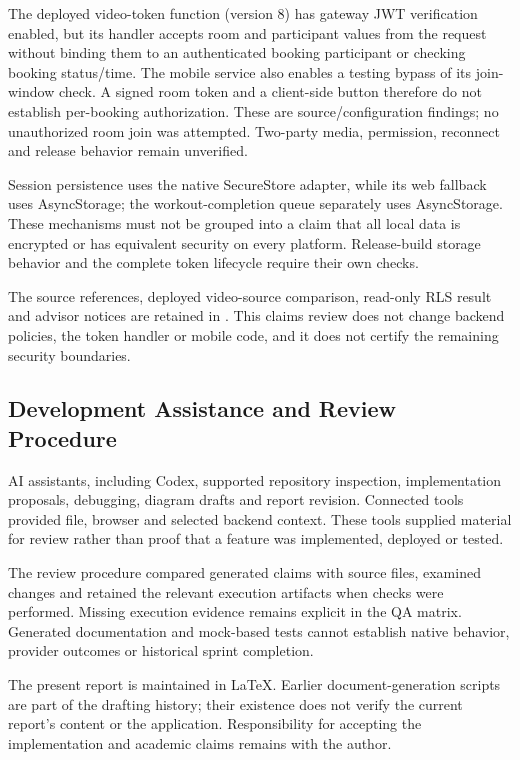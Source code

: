 \documentclass[12pt,a4paper,openany]{report}
\begin{document}
The deployed video-token function (version 8) has gateway JWT verification enabled, but its handler accepts room and participant values from the request without binding them to an authenticated booking participant or checking booking status/time. The mobile service also enables a testing bypass of its join-window check. A signed room token and a client-side button therefore do not establish per-booking authorization. These are source/configuration findings; no unauthorized room join was attempted. Two-party media, permission, reconnect and release behavior remain unverified.

Session persistence uses the native SecureStore adapter, while its web fallback uses AsyncStorage; the workout-completion queue separately uses AsyncStorage. These mechanisms must not be grouped into a claim that all local data is encrypted or has equivalent security on every platform. Release-build storage behavior and the complete token lifecycle require their own checks.

The source references, deployed video-source comparison, read-only RLS result and advisor notices are retained in . This claims review does not change backend policies, the token handler or mobile code, and it does not certify the remaining security boundaries.


\subsection{Development Assistance and Review Procedure}

AI assistants, including Codex, supported repository inspection, implementation proposals, debugging, diagram drafts and report revision. Connected tools provided file, browser and selected backend context. These tools supplied material for review rather than proof that a feature was implemented, deployed or tested.

The review procedure compared generated claims with source files, examined changes and retained the relevant execution artifacts when checks were performed. Missing execution evidence remains explicit in the QA matrix. Generated documentation and mock-based tests cannot establish native behavior, provider outcomes or historical sprint completion.

The present report is maintained in LaTeX. Earlier document-generation scripts are part of the drafting history; their existence does not verify the current report's content or the application. Responsibility for accepting the implementation and academic claims remains with the author.
\end{document}
